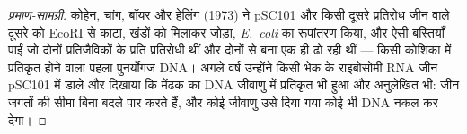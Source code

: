 \begin{proof}[प्रमाण-सामग्री]
कोहेन, चांग, बॉयर और हेलिंग (1973) ने  pSC101 और किसी दूसरे
प्रतिरोध जीन वाले दूसरे  को EcoRI से काटा, खंडों को मिलाकर
जोड़ा, \emph{E.~coli} का रूपांतरण किया, और ऐसी बस्तियाँ पाईं जो दोनों
प्रतिजैविकों के प्रति प्रतिरोधी थीं और दोनों से बना एक ही  ढो
रही थीं --- किसी कोशिका में प्रतिकृत होने वाला पहला पुनर्योगज DNA। अगले
वर्ष उन्होंने किसी भेक के राइबोसोमी RNA जीन pSC101 में डाले और दिखाया कि
मेंढक का DNA जीवाणु में प्रतिकृत भी हुआ और अनुलेखित भी: जीन जगतों की
सीमा बिना बदले पार करते हैं, और कोई जीवाणु उसे दिया गया कोई भी DNA नकल
कर देगा।
\end{proof}

